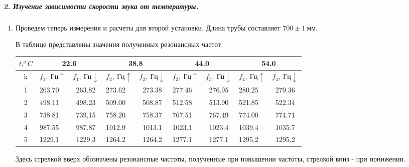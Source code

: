 \documentclass[12pt,a4paper]{article}
\begin{document}
\subparagraph{2. Изучение зависимости скорости звука от температуры.}
\begin{enumerate}
    \item Проведем теперь измерения и расчеты для второй установки.
    Длина трубы составляет $700\pm 1\ мм$.
    
    В таблице представлены значения полученных резонансных частот.
    
    \begin{table}[ht!]
    \begin{center}
        \begin{tabular}{|c|cc|cc|cc|cc|}
        \hline
        $t,^o C$ & \multicolumn{2}{c|}{22.6}                                        & \multicolumn{2}{c|}{38.8}                                        & \multicolumn{2}{c|}{44.0}                                        & \multicolumn{2}{c|}{54.0}                                        \\ \hline
        k        & \multicolumn{1}{l|}{$f_1,\ Гц \uparrow$} & $f_1,\ Гц \downarrow$ & \multicolumn{1}{l|}{$f_2,\ Гц \uparrow$} & $f_2,\ Гц \downarrow$ & \multicolumn{1}{l|}{$f_3,\ Гц \uparrow$} & $f_3,\ Гц \downarrow$ & \multicolumn{1}{l|}{$f_4,\ Гц \uparrow$} & $f_4,\ Гц \downarrow$ \\ \hline
        1        & \multicolumn{1}{l|}{263.70}              & 263.82                & \multicolumn{1}{l|}{273.62}              & 273.38                & \multicolumn{1}{l|}{277.46}              & 276.95                & \multicolumn{1}{l|}{280.25}              & 279.36                \\ \hline
        2        & \multicolumn{1}{l|}{498.11}              & 498.23                & \multicolumn{1}{l|}{509.00}              & 508.87                & \multicolumn{1}{l|}{512.58}              & 513.90                & \multicolumn{1}{l|}{521.85}              & 522.34                \\ \hline
        3        & \multicolumn{1}{l|}{738.81}              & 739.15                & \multicolumn{1}{l|}{758.20}              & 758.37                & \multicolumn{1}{l|}{767.51}              & 767.49                & \multicolumn{1}{l|}{774.00}              & 774.71                \\ \hline
        4        & \multicolumn{1}{l|}{987.55}              & 987.87                & \multicolumn{1}{l|}{1012.9}              & 1013.1                & \multicolumn{1}{l|}{1023.1}              & 1023.4                & \multicolumn{1}{l|}{1039.4}              & 1035.7                \\ \hline
        5        & \multicolumn{1}{l|}{1229.1}              & 1229.3                & \multicolumn{1}{l|}{1264.2}              & 1264.2                & \multicolumn{1}{l|}{1277.1}              & 1277.1                & \multicolumn{1}{l|}{1295.2}              & 1295.2                \\ \hline
    \end{tabular}
    \end{center}
\end{table}
Здесь стрелкой вверх обозначены резонансные частоты, полученные при повышении частоты, стрелкой вниз - при понижении.


\end{enumerate}
\end{document}
